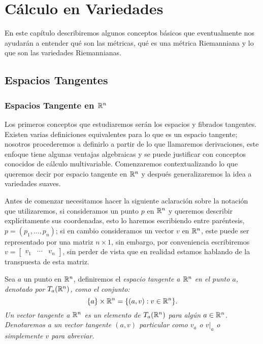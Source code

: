 \chapter{Cálculo en Variedades}\label{Capítulo: Cálculo en Variedades}
En este capítulo describiremos algunos conceptos básicos que eventualmente nos ayudarán a entender qué son las métricas, qué es una métrica Riemanniana y lo que son las variedades Riemannianas.

\section{Espacios Tangentes}
\subsection{Espacios Tangente en $\mathbb{R}^n$}

Los primeros conceptos que estudiaremos serán los espacios y fibrados tangentes. Existen varias definiciones equivalentes para lo que es un espacio tangente; nosotros procederemos a definirlo a partir de lo que llamaremos derivaciones, este enfoque tiene algunas ventajas algebraicas y se puede justificar con conceptos conocidos de cálculo multivariable. Comenzaremos contextualizando lo que queremos decir por espacio tangente en $\mathbb{R}^n$ y después generalizaremos la idea a variedades suaves.

Antes de comenzar necesitamos hacer la siguiente aclaración sobre la notación que utilizaremos, si consideramos un punto $p$ en $\mathbb{R}^n$ y queremos describir explícitamente sus coordenadas, esto lo haremos escribiendo entre paréntesis, $p = (p_1, \ldots, p_n)$; si en cambio consideramos un vector $v$ en $\mathbb{R}^n$, este puede ser representado por una matriz $n \times 1$, sin embargo, por conveniencia escribiremos $v = \begin{bmatrix} v_1 & \cdots & v_n \end{bmatrix}$, sin perder de vista que en realidad estamos hablando de la transpuesta de esta matriz.

\begin{definition}\label{Definición: Espacio Tangente en Rn}
	Sea $a$ un punto en $\mathbb{R}^n$, definiremos el \it{espacio tangente a $\mathbb{R}^n$ en el punto $a$}, denotado por $T_a(\mathbb{R}^n)$, como el conjunto:
	\[ \{a\} \times \mathbb{R}^n = \{(a,v): v \in \mathbb{R}^n\}. \]
	Un \it{vector tangente} a $\mathbb{R}^n$ es un elemento de $T_a(\mathbb{R}^n)$ para algún $a \in \mathbb{R}^n$. Denotaremos a un vector tangente $(a,v)$ particular como $v_a$ o $v|_a$ o simplemente $v$ para abreviar.
\end{definition}

